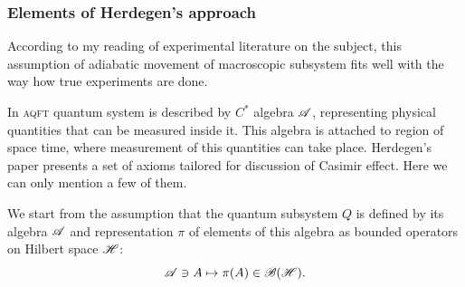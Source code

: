 \documentclass[10pt,t]{beamer}
\begin{document}
\begin{frame}
  \frametitle{Elements of Herdegen's approach}


  According to my reading of experimental literature on the subject,
  this assumption of adiabatic movement of macroscopic subsystem fits
  well with the way how true experiments are done.

  In \textsc{aqft} quantum system is described by $C^{ * }$ algebra
  $\mathcal{A}$, representing physical quantities that can be measured inside it.
  This algebra is attached to region of space time, where measurement of
  this quantities can take place. Herdegen's paper
  \parencite{Herdegen-Quantum-backreaction-ETC-Part-I-Pub-2005}
  presents a set of axioms tailored for discussion of Casimir effect.
  Here we can only mention a few of them.

  We start from the assumption that the quantum subsystem $Q$ is defined by
  its algebra $\mathcal{A}$ and representation $\pi$ of elements of this algebra as
  bounded operators on Hilbert space $\mathcal{H}$:
  \begin{equation}
    \label{eq:Overview-of-Herdegens-approach-ETC-01}
    \mathcal{A} \ni A \mapsto \pi( A ) \in \mathcal{B}( \mathcal{H} ).
  \end{equation}





\end{frame}
\end{document}
